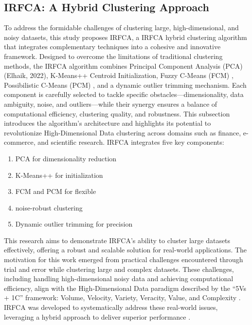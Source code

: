 \documentclass[twoside,11pt]{article}
\renewcommand{\cite}{\citep}
\begin{document}
\subsection{IRFCA: A Hybrid Clustering Approach}
To address the formidable challenges of clustering large, high-dimensional, and noisy datasets, this study proposes IRFCA, a IRFCA hybrid clustering algorithm that integrates complementary techniques into a cohesive and innovative framework. Designed to overcome the limitations of traditional clustering methods, the IRFCA algorithm combines Principal Component Analysis (PCA) (Elhaik, 2022), K-Means++ Centroid Initialization, Fuzzy C-Means (FCM) \cite{bezdek1984}\cite{hashemi2023}, Possibilistic C-Means (PCM) \cite{krishnapuram1993}\cite{mallik2021}, and a dynamic outlier trimming mechanism. Each component is carefully selected to tackle specific obstacles—dimensionality, data ambiguity, noise, and outliers—while their synergy ensures a balance of computational efficiency, clustering quality, and robustness. This subsection introduces the algorithm’s architecture and highlights its potential to revolutionize High-Dimensional Data clustering across domains such as finance, e-commerce, and scientific research. IRFCA integrates five key components:
    \begin{enumerate}[nosep]
        \item PCA for dimensionality reduction
        \item K-Means++ for initialization
        \item FCM and PCM for flexible
        \item noise-robust clustering
        \item Dynamic outlier trimming for precision
    \end{enumerate}
This research aims to demonstrate IRFCA’s ability to cluster large datasets effectively, offering a robust and scalable solution for real-world applications. The motivation for this work emerged from practical challenges encountered through trial and error while clustering large and complex datasets. These challenges, including handling high-dimensional noisy data and achieving computational efficiency, align with the High-Dimensional Data paradigm described by the “5Vs + 1C” framework: Volume, Velocity, Variety, Veracity, Value, and Complexity \cite{benabdellah2019}\cite{thudumu2020}\cite{younas2019}. IRFCA was developed to systematically address these real-world issues, leveraging a hybrid approach to deliver superior performance \cite{hiba2015}\cite{sasikumar2023}.\\
\end{document}
